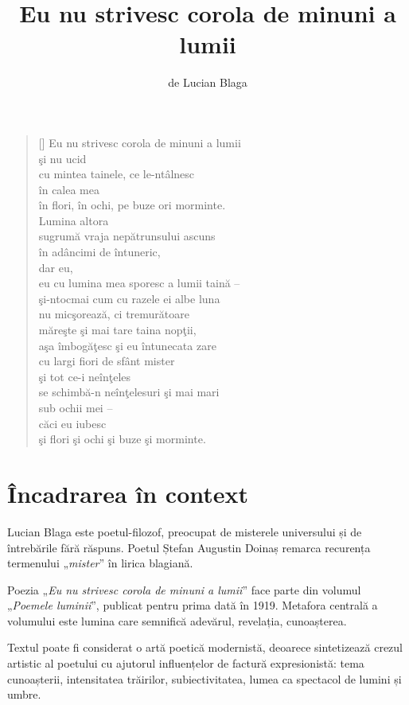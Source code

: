 \documentclass{article}
\title{Eu nu strivesc corola de minuni a lumii}
\author{de Lucian Blaga}
\date{}
\newcommand{\qu}[1]{„\emph{#1}”}
\begin{document}
\maketitle

\settowidth{\versewidth}{eu cu lumina mea sporesc a lumii taină --}
\begin{verse}[\versewidth]
Eu nu strivesc corola de minuni a lumii \\
şi nu ucid \\
cu mintea tainele, ce le-ntâlnesc \\
în calea mea \\
în flori, în ochi, pe buze ori morminte. \\
Lumina altora \\
sugrumă vraja nepătrunsului ascuns \\
în adâncimi de întuneric, \\
dar eu, \\
eu cu lumina mea sporesc a lumii taină -- \\
şi-ntocmai cum cu razele ei albe luna \\
nu micşorează, ci tremurătoare \\
măreşte şi mai tare taina nopţii, \\
aşa îmbogăţesc şi eu întunecata zare \\
cu largi fiori de sfânt mister \\
şi tot ce-i neînţeles \\
se schimbă-n neînţelesuri şi mai mari \\
sub ochii mei -- \\
căci eu iubesc \\
şi flori şi ochi şi buze şi morminte. \\
\end{verse}

\section{Încadrarea în context}
Lucian Blaga este poetul-filozof, preocupat de misterele universului și de întrebările fără răspuns. Poetul Ștefan Augustin Doinaș remarca recurența termenului \qu{mister} în lirica blagiană.

Poezia \qu{Eu nu strivesc corola de minuni a lumii} face parte din volumul \qu{Poemele luminii}, publicat pentru prima dată în 1919. Metafora centrală a volumului este lumina care semnifică adevărul, revelația, cunoașterea.

Textul poate fi considerat o artă poetică modernistă, deoarece sintetizează crezul artistic al poetului cu ajutorul influențelor de factură expresionistă: tema cunoașterii, intensitatea trăirilor, subiectivitatea, lumea ca spectacol de lumini și umbre.
\end{document}
